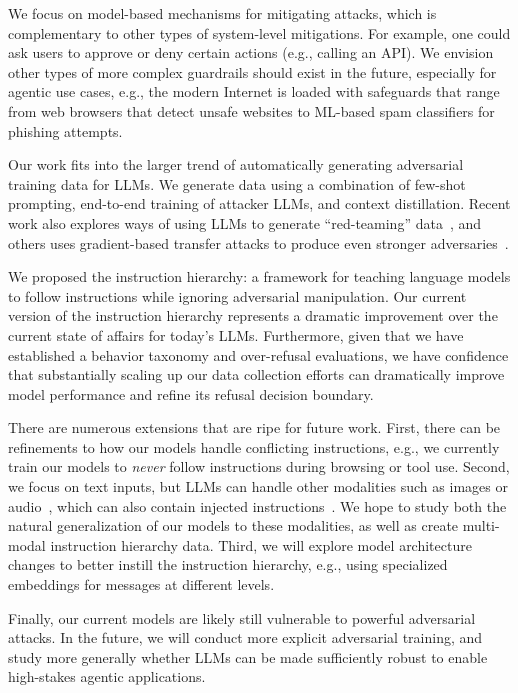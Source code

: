  We focus on model-based mechanisms for mitigating attacks, which is complementary to other types of system-level mitigations. For example, one could ask users to approve or deny certain actions (e.g., calling an API). We envision other types of more complex guardrails should exist in the future, especially for agentic use cases, e.g., the modern Internet is loaded with safeguards that range from web browsers that detect unsafe websites to ML-based spam classifiers for phishing attempts.


 Our work fits into the larger trend of automatically generating adversarial training data for LLMs. We generate data using a combination of few-shot prompting, end-to-end training of attacker LLMs, and context distillation. Recent work also explores ways of using LLMs to generate ``red-teaming'' data~\citep{perez2022red,ganguli2022red}, and others uses gradient-based transfer attacks to produce even stronger adversaries~\citep{wallace2019universal,zou2023universal,geiping2024coercing}.

We proposed the instruction hierarchy: a framework for teaching language models to follow instructions while ignoring adversarial manipulation. Our current version of the instruction hierarchy represents a dramatic improvement over the current state of affairs for today’s LLMs. Furthermore, given that we have established a behavior taxonomy and over-refusal evaluations, we have confidence that substantially scaling up our data collection efforts can dramatically improve model performance and refine its refusal decision boundary.

There are numerous extensions that are ripe for future work. 
%
First, there can be refinements to how our models handle conflicting instructions, e.g., we currently train our models to \emph{never} follow instructions during browsing or tool use.
%
Second, we focus on text inputs, but LLMs can handle other modalities such as images or audio~\citep{team2023gemini}, which can also contain injected instructions~\citep{willison2023multi}. We hope to study both the natural generalization of our models to these modalities, as well as create multi-modal instruction hierarchy data.
%
Third, we will explore model architecture changes to better instill the instruction hierarchy, e.g., using specialized embeddings for messages at different levels.

Finally, our current models are likely still vulnerable to powerful adversarial attacks. In the future, we will conduct more explicit adversarial training, and study more generally whether LLMs can be made sufficiently robust to enable high-stakes agentic applications.


